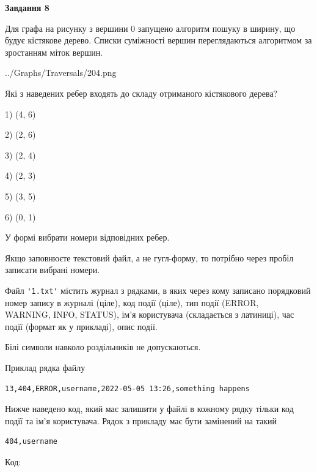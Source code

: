 \documentclass[12pt, ukrainian]{article}
\def\code#1{\Verb!#1!}
\begin{document}
{\begin {large}
{\begin {center}\textbf{Завдання 8}\end {center}}\par
Для графа на рисунку з вершини 0 запущено алгоритм пошуку в ширину, що будує кістякове дерево. Списки суміжності вершин переглядаються алгоритмом за зростанням міток вершин.\par
\begin{center}
	{../Graphs/Traversals/204.png}
\end{center}
\par Які з наведених ребер входять до складу отриманого кістякового дерева?\par
1) (4, 6)\par
2) (2, 6)\par
3) (2, 4)\par
4) (2, 3)\par
5) (3, 5)\par
6) (0, 1)\par
{\vskip 15pt} У формі вибрати номери відповідних ребер.


Якщо заповнюєте текстовий файл, а не гугл-форму, то потрібно через пробіл записа\-ти вибрані номери.\par
\newpage


Файл \code{'1.txt'} містить журнал з рядками, в яких через кому записано поряд\-ко\-вий номер запису в журналі (ціле), код події (ціле), тип події (ERROR, \\WARNING, INFO, STATUS), ім'я користувача (складається з латиниці), час події (фор\-мат як у прикладі), опис події.

Білі символи навколо роздільників не допускаються.

Приклад рядка файлу



\begin{verbatim}
13,404,ERROR,username,2022-05-05 13:26,something happens
\end{verbatim}


Нижче наведено код, який має залишити у файлі в кожному рядку тільки код події та ім'я користувача. Рядок з прикладу має бути замінений на такий



\begin{verbatim}
404,username
\end{verbatim}




Код:




\end{large}}
\end{document}
